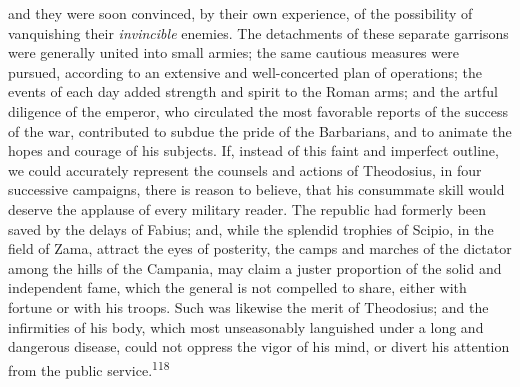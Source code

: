 and they were soon convinced, by their own experience, of the
possibility of vanquishing their \textit{invincible} enemies. The
detachments of these separate garrisons were generally united
into small armies; the same cautious measures were pursued,
according to an extensive and well-concerted plan of operations;
the events of each day added strength and spirit to the Roman
arms; and the artful diligence of the emperor, who circulated the
most favorable reports of the success of the war, contributed to
subdue the pride of the Barbarians, and to animate the hopes and
courage of his subjects. If, instead of this faint and imperfect
outline, we could accurately represent the counsels and actions
of Theodosius, in four successive campaigns, there is reason to
believe, that his consummate skill would deserve the applause of
every military reader. The republic had formerly been saved by
the delays of Fabius; and, while the splendid trophies of Scipio,
in the field of Zama, attract the eyes of posterity, the camps
and marches of the dictator among the hills of the Campania, may
claim a juster proportion of the solid and independent fame,
which the general is not compelled to share, either with fortune
or with his troops. Such was likewise the merit of Theodosius;
and the infirmities of his body, which most unseasonably
languished under a long and dangerous disease, could not oppress
the vigor of his mind, or divert his attention from the public
service.\textsuperscript{118}




